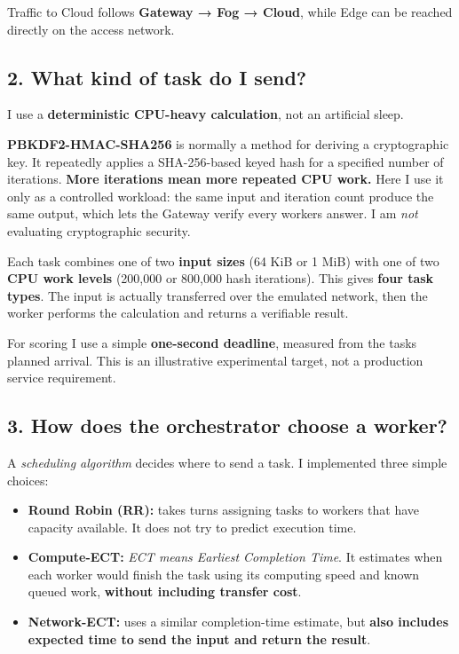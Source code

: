 \documentclass[11pt,a4paper]{article}
\begin{document}
Traffic to Cloud follows \textbf{Gateway → Fog → Cloud}, while Edge can
be reached directly on the access network.

\subsection{2. What kind of task do I
send?}\label{what-kind-of-task-do-i-send}

I use a \textbf{deterministic CPU-heavy calculation}, not an artificial
sleep.

\textbf{PBKDF2-HMAC-SHA256} is normally a method for deriving a
cryptographic key. It repeatedly applies a SHA-256-based keyed hash for
a specified number of iterations. \textbf{More iterations mean more
repeated CPU work.} Here I use it only as a controlled workload: the
same input and iteration count produce the same output, which lets the
Gateway verify every worker\textquotesingle s answer. I am \emph{not}
evaluating cryptographic security.

Each task combines one of two \textbf{input sizes} (64 KiB or 1 MiB)
with one of two \textbf{CPU work levels} (200,000 or 800,000 hash
iterations). This gives \textbf{four task types}. The input is actually
transferred over the emulated network, then the worker performs the
calculation and returns a verifiable result.

For scoring I use a simple \textbf{one-second deadline}, measured from
the task\textquotesingle s planned arrival. This is an illustrative
experimental target, not a production service requirement.

\subsection{3. How does the orchestrator choose a
worker?}\label{how-does-the-orchestrator-choose-a-worker}

A \emph{scheduling algorithm} decides where to send a task. I
implemented three simple choices:

\begin{itemize}
\tightlist
\item
  \textbf{Round Robin (RR):} takes turns assigning tasks to workers that
  have capacity available. It does not try to predict execution time.
\item
  \textbf{Compute-ECT:} \emph{ECT means Earliest Completion Time}. It
  estimates when each worker would finish the task using its computing
  speed and known queued work, \textbf{without including transfer cost}.
\item
  \textbf{Network-ECT:} uses a similar completion-time estimate, but
  \textbf{also includes expected time to send the input and return the
  result}.
\end{itemize}
\end{document}
